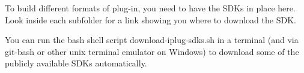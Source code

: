 To build different formats of plug-\/in, you need to have the S\+D\+Ks in place here. Look inside each subfolder for a link showing you where to download the S\+DK.

You can run the bash shell script {\ttfamily download-\/iplug-\/sdks.\+sh} in a terminal (and via git-\/bash or other unix terminal emulator on Windows) to download some of the publicly available S\+D\+Ks automatically. 
